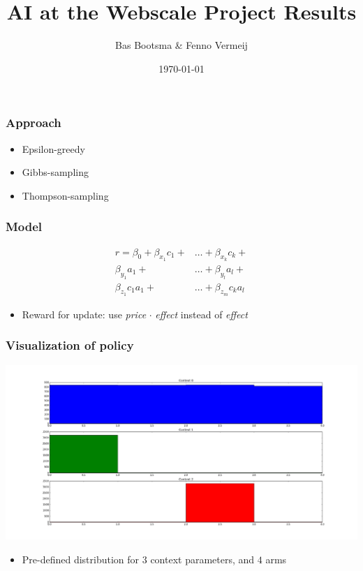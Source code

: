 \documentclass{beamer}
\title[AI@Webscale Presentation]{
  AI at the Webscale Project Results}
\author[Bas Bootsma, Fenno Vermeij]{Bas Bootsma \& Fenno Vermeij}
\institute[Radboud University Nijmegen]{Radboud University Nijmegen}
\date{\today}
\begin{document}
\begin{frame}
  \titlepage
\end{frame}

\begin{frame}
	\frametitle{Approach}	
	\begin{itemize}
		\item Epsilon-greedy
		\item Gibbs-sampling
		\item Thompson-sampling
	\end{itemize}
\end{frame}

\begin{frame}
	\frametitle{Model}
	
		\begin{align*} r = \beta_0 + \beta_{x_1} c_1 + &\ldots + \beta_{x_k} c_k + \\
	    \beta_{y_1} a_1 + &\ldots + \beta_{y_l} a_l + \\
	    \beta_{z_1} c_1a_1 + &\ldots + \beta_{z_m} c_ka_l 
	    \end{align*}
	    \begin{itemize}
		\item Reward for update: use \emph{price} $\cdot$ \emph{effect} instead of \emph{effect}
	\end{itemize}
\end{frame}

\begin{frame}
	\frametitle{Visualization of policy}
	\includegraphics[width=\textwidth]{test.png}
	\begin{itemize}
		\item Pre-defined distribution for $3$ context parameters, and $4$ arms
	\end{itemize}
\end{frame}
\end{document}
